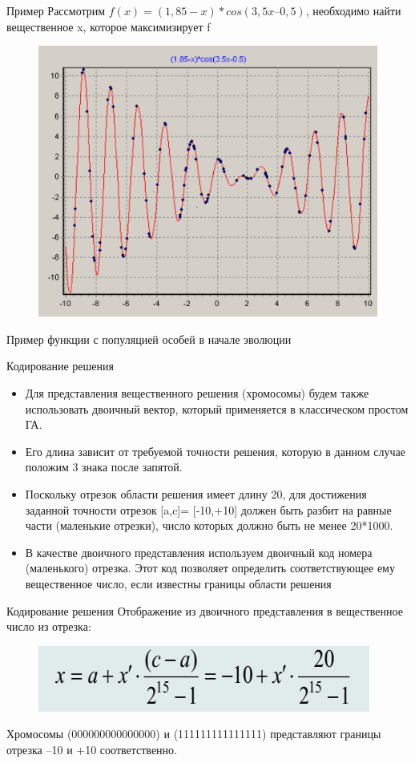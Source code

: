 \documentclass{beamer}
\begin{document}
\begin{frame}{Пример}
Рассмотрим $f(x)=(1,85 -x)*cos(3,5x – 0,5)$, необходимо найти вещественное x, которое максимизирует f
\begin{figure}[h]
\centering
\includegraphics[scale=0.5]{images/lec04-pic14.png}
\end{figure}
Пример функции с популяцией особей в начале эволюции
\end{frame}

\begin{frame}{Кодирование решения}
\begin{itemize}
\item Для представления вещественного решения (хромосомы) будем также использовать двоичный вектор, который применяется в классическом простом ГА.
\item Его длина зависит от требуемой точности решения, которую
в данном случае положим 3 знака после запятой.
\item Поскольку отрезок области решения имеет длину 20, для
достижения заданной точности отрезок [a,c]= [-10,+10]
должен быть разбит на равные части (маленькие отрезки),
число которых должно быть не менее 20*1000.
\item В качестве двоичного представления используем двоичный
код номера (маленького) отрезка. Этот код позволяет
определить соответствующее ему вещественное число,
если известны границы области решения
\end{itemize}
\end{frame}

\begin{frame}{Кодирование решения}
Отображение из двоичного представления в вещественное число из отрезка: 
\begin{figure}[h]
\centering
\includegraphics[scale=0.75]{images/lec04-pic15.png}
\end{figure}
Хромосомы (000000000000000) и (111111111111111) представляют границы отрезка –10 и +10 соответственно.
\end{frame}
\end{document}
